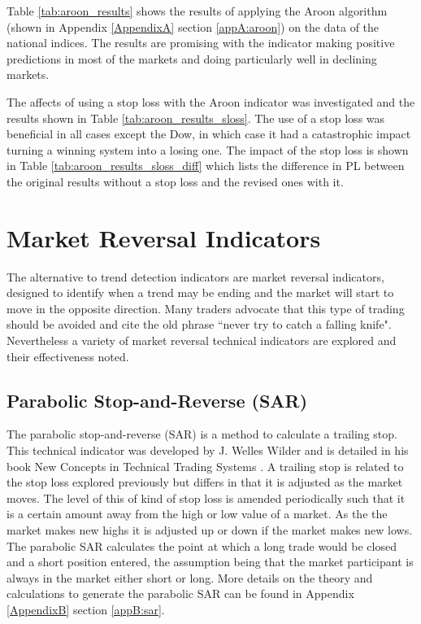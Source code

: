 

Table \ref{tab:aroon_results} shows the results of applying the Aroon algorithm (shown in Appendix \ref{AppendixA} section \ref{appA:aroon}) on the data of the national indices. The results are promising with the indicator making positive predictions in most of the markets and doing particularly well in declining markets. 



The affects of using a stop loss with the Aroon indicator was investigated and the results shown in Table \ref{tab:aroon_results_sloss}. The use of a stop loss was beneficial in all cases except the Dow, in which case it had a catastrophic impact turning a winning system into a losing one.  The impact of the stop loss is shown in Table \ref{tab:aroon_results_sloss_diff} which lists the difference in PL between the original results without a stop loss and the revised ones with it.



\section{Market Reversal Indicators}
The alternative to trend detection indicators are market reversal indicators, designed to identify when a trend may be ending and the market will start to move in the opposite direction. Many traders advocate that this type of trading should be avoided and cite the old phrase \textquotedblleft never try to catch a falling knife". Nevertheless a variety of market reversal technical indicators are explored and their effectiveness noted.

\subsection{Parabolic Stop-and-Reverse  (SAR)}
The parabolic stop-and-reverse (SAR) is a method to calculate a trailing stop. This technical indicator was developed by J. Welles Wilder and is detailed in his book New Concepts in Technical Trading Systems \citep{wilder1978new}. A trailing stop is related to the stop loss explored previously but differs in that it is adjusted as the market moves. The level of this of kind of stop loss is amended periodically such that it is a certain amount away from the high or low value of a market. As the the market makes new highs it is adjusted up or down if the market makes new lows. The parabolic SAR calculates the point at which a long trade would be closed and a short position entered, the assumption being that the market participant is always in the market either short or long. More details on the theory and calculations to generate the parabolic SAR can be found in Appendix \ref{AppendixB} section \ref{appB:sar}.  

